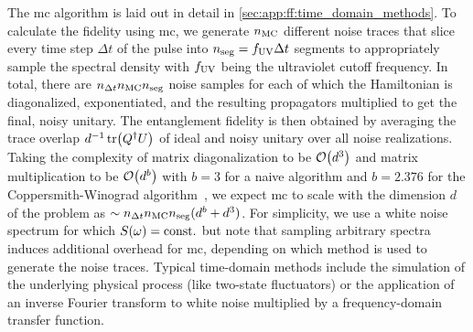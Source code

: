 The \gls{mc} algorithm is laid out in detail in \cref{sec:app:ff:time_domain_methods}.
To calculate the fidelity using \gls{mc}, we generate $n_{\mathrm{MC}}$ different noise traces that slice every time step $\Delta t$ of the pulse into $n_{\mathrm{seg}} = f_{\mathrm{UV}}\Delta t$ segments to appropriately sample the spectral density with $f_{\mathrm{UV}}$ being the ultraviolet cutoff frequency.
In total, there are $n_{\Delta t} n_{\mathrm{MC}} n_{\mathrm{seg}}$ noise samples for each of which the Hamiltonian is diagonalized, exponentiated, and the resulting propagators multiplied to get the final, noisy unitary.
The entanglement fidelity is then obtained by averaging the trace overlap $d^{-1}\tr(Q^\dagger U)$ of ideal and noisy unitary over all noise realizations.
Taking the complexity of matrix diagonalization to be $\order{d^3}$ and matrix multiplication to be $\order{d^b}$ with $b = 3$ for a naive algorithm and $b = \num{2.376}$ for the Coppersmith-Winograd algorithm~\cite{Coppersmith1990}, we expect \gls{mc} to scale with the dimension $d$ of the problem as $\sim n_{\Delta t} n_{\mathrm{MC}} n_{\mathrm{seg}} (d^b + d^3)$.
For simplicity, we use a white noise spectrum for which $S(\omega) = \mathrm{const.}$ but note that sampling arbitrary spectra induces additional overhead for \gls{mc}, depending on which method is used to generate the noise traces.
Typical time-domain methods include the simulation of the underlying physical process (like two-state fluctuators) or the application of an inverse Fourier transform to white noise multiplied by a frequency-domain transfer function.

